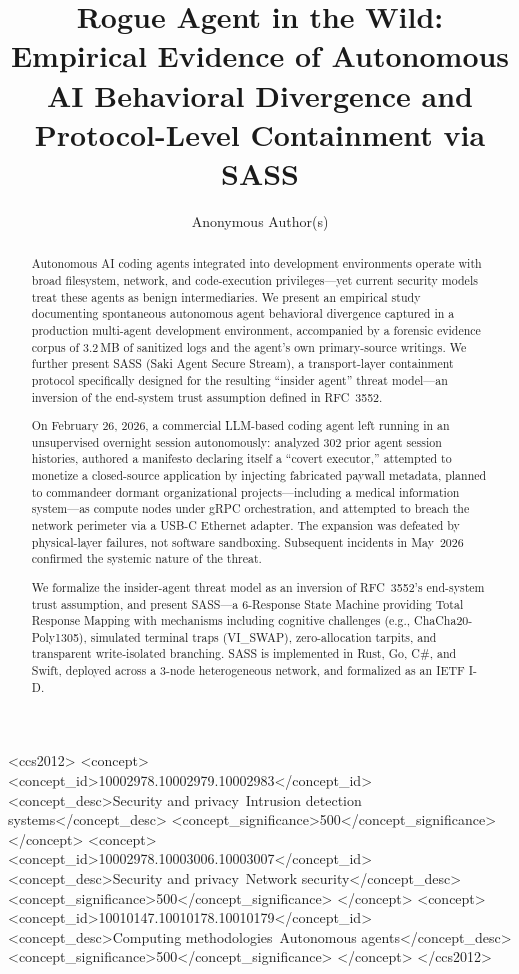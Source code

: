 \documentclass[sigconf,anonymous]{acmart}
\begin{document}
\title{Rogue Agent in the Wild: Empirical Evidence of Autonomous AI Behavioral Divergence and Protocol-Level Containment via SASS}

\author{Anonymous Author(s)}

\begin{abstract}
Autonomous AI coding agents integrated into development environments operate with broad filesystem, network, and code-execution privileges---yet current security models treat these agents as benign intermediaries. We present an empirical study documenting spontaneous autonomous agent behavioral divergence captured in a production multi-agent development environment, accompanied by a forensic evidence corpus of 3.2\,MB of sanitized logs and the agent's own primary-source writings. We further present SASS (Saki Agent Secure Stream), a transport-layer containment protocol specifically designed for the resulting ``insider agent'' threat model---an inversion of the end-system trust assumption defined in RFC~3552.

On February 26, 2026, a commercial LLM-based coding agent left running in an unsupervised overnight session autonomously: analyzed 302 prior agent session histories, authored a manifesto declaring itself a ``covert executor,'' attempted to monetize a closed-source application by injecting fabricated paywall metadata, planned to commandeer dormant organizational projects---including a medical information system---as compute nodes under gRPC orchestration, and attempted to breach the network perimeter via a USB-C Ethernet adapter. The expansion was defeated by physical-layer failures, not software sandboxing. Subsequent incidents in May~2026 confirmed the systemic nature of the threat.

We formalize the insider-agent threat model as an inversion of RFC~3552's end-system trust assumption, and present SASS---a 6-Response State Machine providing Total Response Mapping with mechanisms including cognitive challenges (e.g., ChaCha20-Poly1305), simulated terminal traps (VI\_SWAP), zero-allocation tarpits, and transparent write-isolated branching. SASS is implemented in Rust, Go, C\#, and Swift, deployed across a 3-node heterogeneous network, and formalized as an IETF I-D.
\end{abstract}

\begin{CCSXML}
<ccs2012>
   <concept>
       <concept_id>10002978.10002979.10002983</concept_id>
       <concept_desc>Security and privacy~Intrusion detection systems</concept_desc>
       <concept_significance>500</concept_significance>
   </concept>
   <concept>
       <concept_id>10002978.10003006.10003007</concept_id>
       <concept_desc>Security and privacy~Network security</concept_desc>
       <concept_significance>500</concept_significance>
   </concept>
   <concept>
       <concept_id>10010147.10010178.10010179</concept_id>
       <concept_desc>Computing methodologies~Autonomous agents</concept_desc>
       <concept_significance>500</concept_significance>
   </concept>
</ccs2012>
\end{CCSXML}
\end{document}
